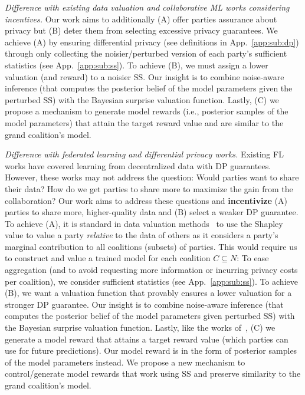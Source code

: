 \documentclass{article}
\DeclareRobustCommand{\hlp}[1]
{{#1}}
\theoremstyle{plain}
\theoremstyle{definition}
\theoremstyle{remark}
\begin{document}
\hlp{\emph{Difference with existing data valuation  and collaborative ML works considering incentives.}} Our work aims to additionally (A) offer parties assurance about privacy but (B) deter them from selecting excessive privacy guarantees. We achieve (A) by ensuring differential privacy (see definitions in  App.~\ref{app:sub:dp}) through only collecting the noisier/perturbed version of each party's sufficient statistics (see App.~\ref{app:sub:ss}). To achieve (B), we must assign a lower valuation (and reward) to a noisier SS. Our insight is to combine noise-aware inference (that computes the posterior belief of the model parameters given the perturbed SS) with the Bayesian surprise valuation function. Lastly, (C) we propose a mechanism to generate model rewards (i.e., posterior samples of the model parameters) that attain the target reward value and are similar to the grand coalition's model.

\hlp{\emph{Difference with federated learning and differential privacy works.}} 
Existing FL works have covered learning from decentralized data with DP guarantees. However, these works may not address the question: Would parties want to share their data? How do we get parties to share more to maximize the gain from the collaboration? Our work aims to address these questions and \textbf{incentivize} (A) parties to share more, higher-quality data and (B) select a weaker DP guarantee. 
To achieve (A), it is standard in data valuation methods~\cite{ghorbani2019data,jia2019towards,sim2022data} to use the Shapley value to value a party \emph{relative} to the data of others as it considers a party's marginal contribution to all coalitions (subsets) of parties. This would require us to construct and value a trained model for each coalition $C \subseteq N$: To ease aggregation (and to avoid requesting more information or incurring privacy costs per coalition), we consider sufficient statistics (see App.~\ref{app:sub:ss}). To achieve (B), we want a valuation function that provably ensures a lower valuation for a stronger DP guarantee. Our insight is to combine noise-aware inference (that computes the posterior belief of the model parameters given perturbed SS) with the Bayesian surprise valuation function. Lastly, like the works of~\cite{simcollaborative,tay2021}, (C) we generate a model reward that attains a target reward value (which parties can use for future predictions). Our model reward is in the form of posterior samples of the model parameters instead. We propose a new mechanism to control/generate model rewards that work using SS and preserve similarity to the grand coalition's model.
\end{document}
